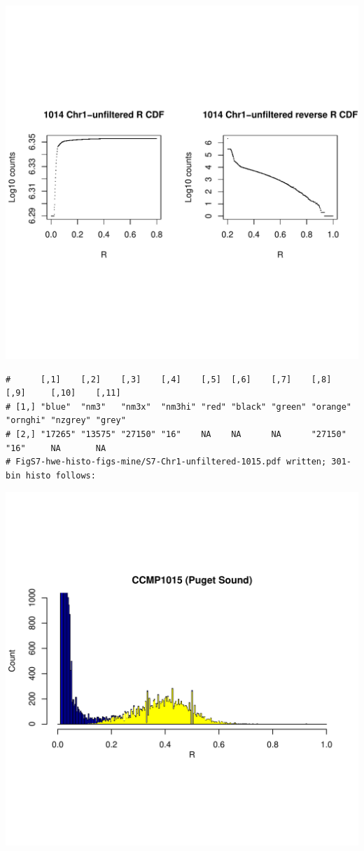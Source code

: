 \documentclass{article}\usepackage[]{graphicx}\usepackage[]{color}
\makeatletter
\def\maxwidth{ %
  \ifdim\Gin@nat@width>\linewidth
    \linewidth
  \else
    \Gin@nat@width
  \fi
}
\newenvironment{kframe}{%
 \def\at@end@of@kframe{}%
 \ifinner\ifhmode%
  \def\at@end@of@kframe{\end{minipage}}%
  \begin{minipage}{\columnwidth}%
 \fi\fi%
 \def\FrameCommand##1{\hskip\@totalleftmargin \hskip-\fboxsep
 \colorbox{shadecolor}{##1}\hskip-\fboxsep
     \hskip-\linewidth \hskip-\@totalleftmargin \hskip\columnwidth}%
 \MakeFramed {\advance\hsize-\width
   \@totalleftmargin\z@ \linewidth\hsize
   \@setminipage}}%
 {\par\unskip\endMakeFramed%
 \at@end@of@kframe}
\newenvironment{knitrout}{}{} %
\makeatother
\begin{document}
\begin{knitrout}
\includegraphics[width=\maxwidth]{FigS7-hwe-histo-figs-knitr/unnamed-chunk-10-22} 
\begin{kframe}\begin{verbatim}
#      [,1]    [,2]    [,3]    [,4]    [,5]  [,6]    [,7]    [,8]     [,9]     [,10]    [,11] 
# [1,] "blue"  "nm3"   "nm3x"  "nm3hi" "red" "black" "green" "orange" "ornghi" "nzgrey" "grey"
# [2,] "17265" "13575" "27150" "16"    NA    NA      NA      "27150"  "16"     NA       NA    
# FigS7-hwe-histo-figs-mine/S7-Chr1-unfiltered-1015.pdf written; 301-bin histo follows:
\end{verbatim}
\end{kframe}
\includegraphics[width=\maxwidth]{FigS7-hwe-histo-figs-knitr/unnamed-chunk-10-23} 

\end{knitrout}
\end{document}
